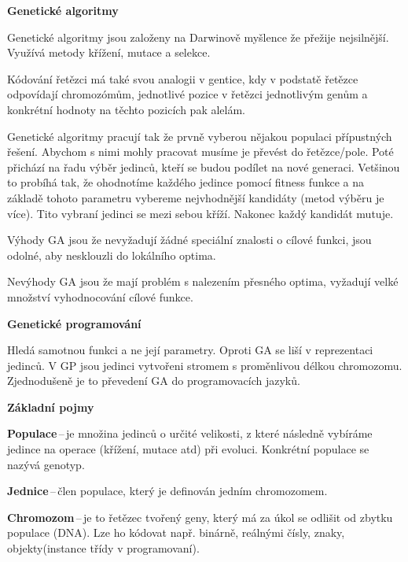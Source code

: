 \begin{Large}\vspace{0,5cm} \textbf{Genetické algoritmy}
\end{Large}

Genetické algoritmy jsou založeny na Darwinově myšlence že přežije nejsilnější. Využívá metody křížení, mutace a selekce.

Kódování řetězci má také svou analogii v gentice, kdy v podstatě řetězce odpovídají chromozómům, jednotlivé pozice v řetězci jednotlivým genům a konkrétní hodnoty na těchto pozicích pak alelám.

Genetické algoritmy pracují tak že prvně vyberou nějakou populaci přípustných řešení. Abychom s nimi mohly pracovat musíme je převést do řetězce/pole. Poté přichází na řadu výběr jedinců, kteří se budou podílet na nové generaci. Vetšinou to probíhá tak, že ohodnotíme každého jedince pomocí fitness funkce a na základě tohoto parametru vybereme nejvhodnější kandidáty (metod výběru je více). Tito vybraní jedinci se mezi sebou kříží. Nakonec každý kandidát mutuje. 

Výhody GA jsou že nevyžadují žádné speciální znalosti o cílové funkci, jsou odolné, aby nesklouzli do lokálního optima.

Nevýhody GA jsou že mají problém s nalezením přesného optima, vyžadují velké množství vyhodnocování cílové funkce.

\begin{Large}\vspace{0,5cm} \textbf{Genetické programování}
\end{Large}

Hledá samotnou funkci a ne její parametry. Oproti GA se liší v reprezentaci jedinců. V GP jsou jedinci vytvořeni stromem s proměnlivou délkou chromozomu. Zjednodušeně je to převedení GA do programovacích jazyků.

\begin{Large}\vspace{0,5cm} \textbf{Základní pojmy}
\end{Large}

\textbf{Populace}\,--\,je množina jedinců o určité velikosti, z které následně vybíráme jedince na operace (křížení, mutace atd) při evoluci. Konkrétní populace se nazývá genotyp. 

\textbf{Jednice}\,--\,člen populace, který je definován jedním chromozomem.

\textbf{Chromozom}\,--\,je to řetězec tvořený geny, který má za úkol se odlišit od zbytku populace (DNA). Lze ho kódovat např. binárně, reálnými čísly, znaky, objekty(instance třídy v programovaní).

